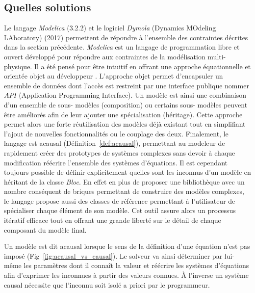 \subsection{Quelles solutions} %
\label{sub:quelles_solutions}
Le langage \emph{Modelica} (3.2.2) et le logiciel \emph{Dymola} (Dynamics MOdeling
LAboratory) (2017) permettent de répondre à l’ensemble des contraintes décrites dans la
section précédente. \emph{Modelica} est un langage de programmation libre et ouvert
développé pour répondre aux contraintes de la modélisation multi-physique. Il a été pensé
pour être intuitif en offrant une approche équationnelle et orientée objet au développeur
\parencite{Wetter2016290}.
L’approche objet permet d’encapsuler un ensemble de données dont l’accès est restreint par
une interface publique nommer $API$ (Application Programming Interface). Un modèle est
ainsi une combinaison d’un ensemble de sous- modèles (composition) ou certains sous-
modèles peuvent être améliorés afin de leur ajouter une spécialisation (héritage). Cette
approche permet alors une forte réutilisation des modèles déjà existant tout en
simplifiant l’ajout de nouvelles fonctionnalités ou le couplage des deux. Finalement, le
langage est acausal (Définition~\ref{def:acausal}), permettant au modeleur de rapidement
créer des prototypes de systèmes complexes sans devoir à chaque modification réécrire
l’ensemble des systèmes d’équations. Il est cependant toujours possible de définir
explicitement quelles sont les inconnus d’un modèle en héritant de la classe \emph{Bloc}.
En effet en plus de proposer une bibliothèque avec un nombre conséquent de briques
permettant de construire des modèles complexes, le langage propose aussi des classes de
référence permettant à l’utilisateur de spécialiser chaque élément de son modèle. Cet
outil assure alors un processus itératif efficace tout en offrant une grande liberté sur
le détail de chaque composant du modèle final.


\begin{Def}[Acausal]\label{def:acausal}
Un modèle est dit acausal lorsque le sens de la définition d’une équation n’est pas
imposé (Fig~\ref{fig:acausal_vs_causal}). Le solveur va ainsi déterminer par lui-même les
paramètres dont il connaît la valeur et réécrire les systèmes d’équations afin d’exprimer
les inconnues à partir des valeurs connues. À l’inverse un système causal nécessite
que l’inconnu soit isolé a priori par le programmeur.
\end{Def}

